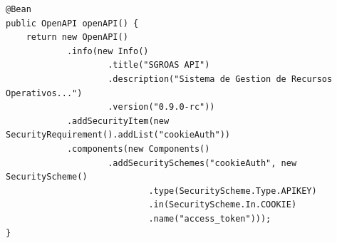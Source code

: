 \begin{lstlisting}[style=javaStyle, label=lst:oa, caption={OpenApiConfig.java — bean OpenAPI con cookie auth (fragmento)}]
@Bean
public OpenAPI openAPI() {
    return new OpenAPI()
            .info(new Info()
                    .title("SGROAS API")
                    .description("Sistema de Gestion de Recursos Operativos...")
                    .version("0.9.0-rc"))
            .addSecurityItem(new SecurityRequirement().addList("cookieAuth"))
            .components(new Components()
                    .addSecuritySchemes("cookieAuth", new SecurityScheme()
                            .type(SecurityScheme.Type.APIKEY)
                            .in(SecurityScheme.In.COOKIE)
                            .name("access_token")));
}
\end{lstlisting}